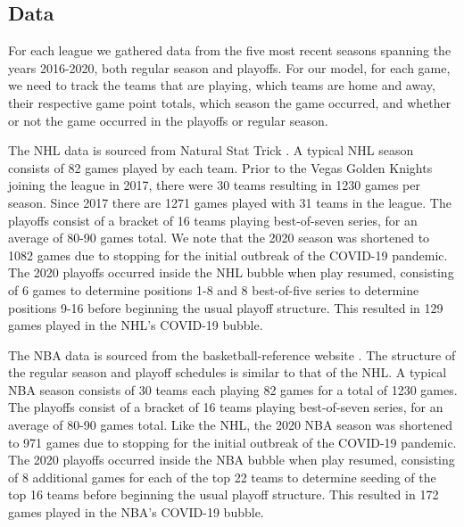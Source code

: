 \subsection{Data}

For each league we gathered data from the five most recent seasons spanning the years 2016-2020, both regular season and playoffs. For our model, for each game, we need to track the teams that are playing, which teams are home and away, their respective game point totals, which season the game occurred, and whether or not the game occurred in the playoffs or regular season.

The NHL data is sourced from Natural Stat Trick \cite{NS2020}. A typical NHL season consists of 82 games played by each team. Prior to the Vegas Golden Knights joining the league in 2017, there were 30 teams resulting in 1230 games per season. Since 2017 there are 1271 games played with 31 teams in the league. The playoffs consist of a bracket of 16 teams playing best-of-seven series, for an average of 80-90 games total. We note that the 2020 season was shortened to 1082 games due to stopping for the initial outbreak of the COVID-19 pandemic. The 2020 playoffs occurred inside the NHL bubble when play resumed, consisting of 6 games to determine positions 1-8 and 8 best-of-five series to determine positions 9-16 before beginning the usual playoff structure. This resulted in 129 games played in the NHL's COVID-19 bubble.

The NBA data is sourced from the basketball-reference website \cite{BR2020}. The structure of the regular season and playoff schedules is similar to that of the NHL. A typical NBA season consists of 30 teams each playing 82 games for a total of 1230 games. The playoffs consist of a bracket of 16 teams playing best-of-seven series, for an average of 80-90 games total. Like the NHL, the 2020 NBA season was shortened to 971 games due to stopping for the initial outbreak of the COVID-19 pandemic. The 2020 playoffs occurred inside the NBA bubble when play resumed, consisting of 8 additional games for each of the top 22 teams to determine seeding of the top 16 teams before beginning the usual playoff structure. This resulted in 172 games played in the NBA's COVID-19 bubble.

